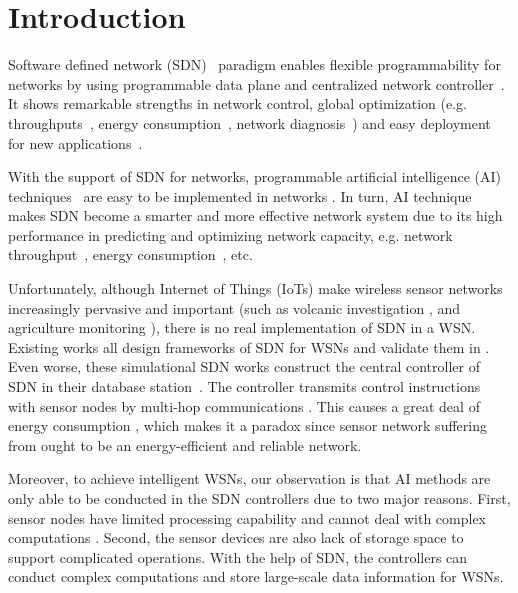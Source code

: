 \section{Introduction}


Software defined network (SDN)~\cite{Benzekki2016Software,Sezer2013Are} paradigm
enables flexible programmability for networks 
by using programmable data plane and centralized network controller~\cite{7122247}.
It shows remarkable strengths in network control, global optimization 
(e.g. throughputs~\cite{Alicherry2005Joint}, energy consumption~\cite{Miao2010Cross}, network diagnosis~\cite{gong2015directional})
and easy deployment for new applications~\cite{Feamster2014The}.

With the support of SDN for networks, programmable artificial intelligence (AI) 
techniques~\cite{Norvig1995Artificial, Poole2010Artificial, Cockburn1996ARCHON} 
are easy to be implemented in networks \cite{mahmud2011exploitation}.
In turn, AI technique makes SDN become a smarter and more effective network system
due to its high performance in predicting and optimizing network capacity\cite{mahmud2011exploitation},
e.g. network throughput~\cite{Alicherry2005Joint}, energy consumption~\cite{Miao2010Cross}, etc.
 
Unfortunately, although Internet of Things (IoTs) \cite{Atzori2010The} 
make wireless sensor networks \cite{Potdar2009Wireless}
increasingly pervasive and important (such as volcanic investigation 
\cite{Wernerallen2006Deploying}, and agriculture monitoring \cite{Wang2010L3SN}), 
there is no real implementation of SDN in a WSN. Existing works 
 \cite{mahmud2011exploitation, costanzo2012software, luo2012sensor, de2015tinysdn, galluccio2015sdn} 
all design frameworks of SDN for WSNs and validate them in  .  
Even worse, these simulational SDN works construct the central controller 
of SDN in their database station~\cite{Potdar2009Wireless}. The controller transmits control 
instructions with sensor nodes by multi-hop communications \cite{Mizuyama2017Estimation}.
This causes a great deal of energy consumption \cite{Yang2014}, which 
makes it a paradox since sensor network suffering from 
ought to be an energy-efficient and reliable network.

Moreover, to achieve intelligent WSNs, 
our observation is that AI methods 
are only able to be conducted in the SDN controllers 
due to two major reasons. 
First, sensor nodes 
have limited processing capability and cannot 
deal with complex computations \cite{Sharma2012Security,Heller2012The}.
Second, the sensor devices are also lack of storage space 
to support complicated operations. With the help of SDN, 
the controllers can conduct complex computations 
and store large-scale data information for WSNs.


